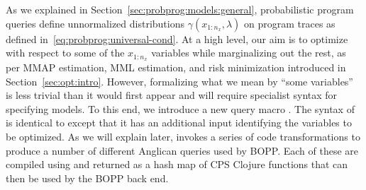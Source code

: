 
As we explained in Section~\ref{sec:probprog:models:general}, probabilistic program queries
define unnormalized distributions $\gamma(x_{1:n_x},\lambda)$ on program traces
 as defined in~\eqref{eq:probprog:universal-cond}.
At a high level, our aim is to optimize with respect to some of the $x_{1:n_x}$ variables while marginalizing out
the rest, as per MMAP estimation, MML estimation, and risk minimization introduced in
Section~\ref{sec:opt:intro}.
However, formalizing what we mean by ``some variables'' is less trivial than it would
first appear and will require specialist syntax for specifying models.  To this end,
we introduce a new query macro .  The syntax of  is identical to  except 
that it has an additional input identifying the variables to be optimized.  As we will
explain later,  invokes a series of code transformations to produce a number
of different Anglican queries used by BOPP.  Each of these are compiled using \query
and returned as a hash map of CPS Clojure functions that can then
be used by the BOPP back end.

